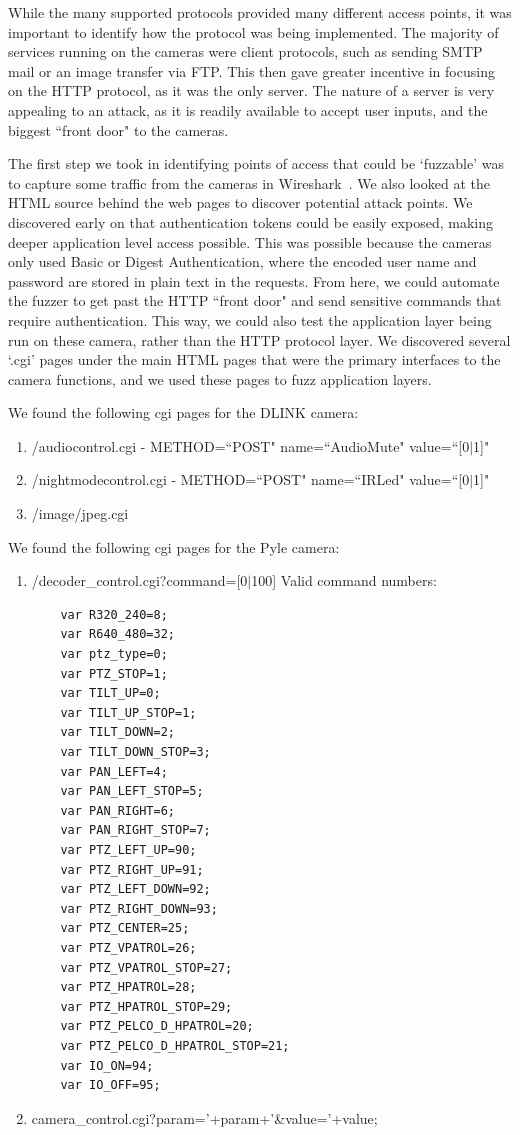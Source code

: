 \documentclass[letterpaper,twocolumn,10pt]{article}
\begin{document}
While the many supported protocols provided many different access points, it was important to identify how the protocol was being implemented. The majority of services running on the cameras were client protocols, such as sending SMTP mail or an image transfer via FTP. This then gave greater incentive in focusing on the HTTP protocol, as it was the only server. The nature of a server is very appealing to an attack, as it is readily available to accept user inputs, and the biggest ``front door" to the cameras.

The first step we took in identifying points of access that could be `fuzzable' was to capture some traffic from the cameras in Wireshark~\cite{wireshark}. We also looked at the HTML source behind the web pages to discover potential attack points. We discovered early on that authentication tokens could be easily exposed, making deeper application level access possible. This was possible because the cameras only used Basic or Digest Authentication, where the encoded user name and password are stored in plain text in the requests. From here, we could automate the fuzzer to get past the HTTP ``front door" and send sensitive commands that require authentication. This way, we could also test the application layer being run on these camera, rather than the HTTP protocol layer. We discovered several `.cgi' pages under the main HTML pages that were the primary interfaces to the camera functions, and we used these pages to fuzz application layers.

We found the following cgi pages for the DLINK camera: 


\begin{enumerate}
	\item /audiocontrol.cgi - METHOD=``POST" name=``AudioMute" value=``[0$\mid$1]"
	\item /nightmodecontrol.cgi - METHOD=``POST" name=``IRLed" value=``[0$\mid$1]"
	\item /image/jpeg.cgi
\end{enumerate}

We found the following cgi pages for the Pyle camera:
\begin{enumerate}
	\item /decoder\_control.cgi?command=[0$\mid$100]
	\newline Valid command numbers:
	\begin{verbatim}
	var R320_240=8;
	var R640_480=32;
	var ptz_type=0;	
	var PTZ_STOP=1;
	var TILT_UP=0;
	var TILT_UP_STOP=1;
	var TILT_DOWN=2;
	var TILT_DOWN_STOP=3;
	var PAN_LEFT=4;
	var PAN_LEFT_STOP=5;
	var PAN_RIGHT=6;
	var PAN_RIGHT_STOP=7;
	var PTZ_LEFT_UP=90;
	var PTZ_RIGHT_UP=91;
	var PTZ_LEFT_DOWN=92;
	var PTZ_RIGHT_DOWN=93;
	var PTZ_CENTER=25;
	var PTZ_VPATROL=26;
	var PTZ_VPATROL_STOP=27;
	var PTZ_HPATROL=28;
	var PTZ_HPATROL_STOP=29;
	var PTZ_PELCO_D_HPATROL=20;
	var PTZ_PELCO_D_HPATROL_STOP=21;
	var IO_ON=94;
	var IO_OFF=95;
	\end{verbatim}
	\item camera\_control.cgi?param='+param+'\&value='+value; 
\end{enumerate}
\end{document}
